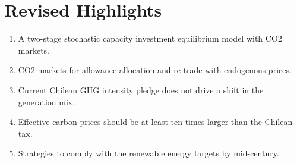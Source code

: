 \documentclass{article}
\begin{document}





\section{Revised Highlights}

\begin{enumerate}
    \item A two-stage stochastic capacity investment equilibrium model with CO2 markets.
    
    \item CO2 markets for allowance allocation and re-trade with endogenous prices.
    
    \item Current Chilean GHG intensity pledge does not drive a shift in the generation mix.
    
    \item Effective carbon prices should be at least ten times larger than the Chilean tax.
    
    \item Strategies to comply with the renewable energy targets by mid-century.
\end{enumerate}
\end{document}
